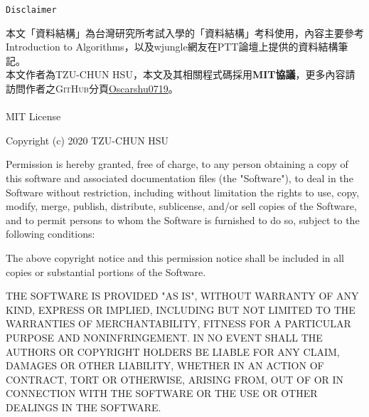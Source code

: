 \begin{center}
    \Huge{\texttt{Disclaimer}}\\
\end{center}

本文「資料結構」為台灣研究所考試入學的「資料結構」考科使用，內容主要參考Introduction to Algorithms\cite{1}，以及wjungle網友在PTT論壇上提供的資料結構筆記\cite{2}。 \\
本文作者為\textsc{TZU-CHUN HSU}，本文及其相關程式碼採用\textbf{MIT協議}，更多內容請訪問作者之\textsc{GitHub}分頁\href{https://github.com/Oscarshu0719}{Oscarshu0719}。 \\~\\

\con
MIT License

Copyright (c) 2020 TZU-CHUN HSU

Permission is hereby granted, free of charge, to any person obtaining a copy
of this software and associated documentation files (the "Software"), to deal
in the Software without restriction, including without limitation the rights
to use, copy, modify, merge, publish, distribute, sublicense, and/or sell
copies of the Software, and to permit persons to whom the Software is
furnished to do so, subject to the following conditions:

The above copyright notice and this permission notice shall be included in all
copies or substantial portions of the Software.

THE SOFTWARE IS PROVIDED "AS IS", WITHOUT WARRANTY OF ANY KIND, EXPRESS OR
IMPLIED, INCLUDING BUT NOT LIMITED TO THE WARRANTIES OF MERCHANTABILITY,
FITNESS FOR A PARTICULAR PURPOSE AND NONINFRINGEMENT. IN NO EVENT SHALL THE
AUTHORS OR COPYRIGHT HOLDERS BE LIABLE FOR ANY CLAIM, DAMAGES OR OTHER
LIABILITY, WHETHER IN AN ACTION OF CONTRACT, TORT OR OTHERWISE, ARISING FROM,
OUT OF OR IN CONNECTION WITH THE SOFTWARE OR THE USE OR OTHER DEALINGS IN THE
SOFTWARE.

\tnr
\pagebreak
